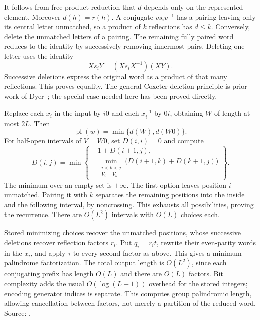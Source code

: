 It follows from free-product reduction that \(d\)
depends only on the represented element. Moreover
\(d(h)=r(h)\). A conjugate \(vs_iv^{-1}\) has a
pairing leaving only its central letter unmatched,
so a product of \(k\) reflections has \(d\leq k\).
Conversely, delete the unmatched letters of a
pairing. The remaining fully paired word reduces
to the identity by successively removing innermost
pairs. Deleting one letter uses the identity
\[
 Xs_iY=(Xs_iX^{-1})(XY).
\]
Successive deletions express the original word
as a product of that many reflections. This
proves equality. The general Coxeter deletion
principle is prior work of Dyer~\cite{dyer};
the special case needed here has been proved directly.

Replace each \(x_i\) in the input by \(i0\) and each
\(x_i^{-1}\) by \(0i\), obtaining \(W\) of length
at most \(2L\). Then
\[
 \operatorname{pl}(w)=\min\{d(W),d(W0)\}.
\]
For half-open intervals of \(V=W0\), set \(D(i,i)=0\) and compute
\[
 D(i,j)=\min\left\{
 \begin{aligned}
 &1+D(i+1,j),\\
 &\min_{\substack{i<k<j\\V_i=V_k}}
       \bigl(D(i+1,k)+D(k+1,j)\bigr)
 \end{aligned}
 \right\}.
\]
The minimum over an empty set is \(+\infty\).
The first option leaves position \(i\) unmatched.
Pairing it with \(k\) separates the remaining
positions into the inside and the following
interval, by noncrossing. This exhausts all
possibilities, proving the recurrence. There
are \(O(L^2)\) intervals with \(O(L)\) choices each.

Stored minimizing choices recover the unmatched
positions, whose successive deletions recover
reflection factors \(r_i\). Put \(q_i=r_it\),
rewrite their even-parity words in the \(x_i\),
and apply \(\tau\) to every second factor as above.
This gives a minimum palindrome factorization.
The total output length is \(O(L^2)\), since
each conjugating prefix has length \(O(L)\)
and there are \(O(L)\) factors. Bit complexity
adds the usual \(O(\log(L+1))\) overhead for
the stored integers; encoding generator indices
is separate. This computes group palindromic
length, allowing cancellation between factors,
not merely a partition of the reduced word.
Source: .
